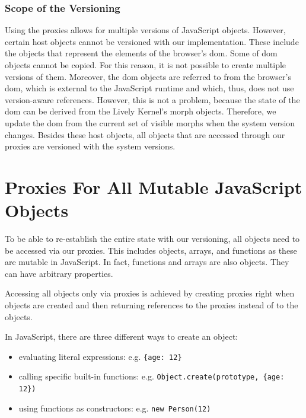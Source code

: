  
\subsubsection{Scope of the Versioning} \label{subsubsec:IMPLEMENTATION:5.2.1}

Using the proxies allows for multiple versions of JavaScript objects.
However, certain host objects cannot be versioned with our implementation.
These include the objects that represent the elements of the browser's \ac{dom}.
Some of \ac{dom} objects cannot be copied.
For this reason, it is not possible to create multiple versions of them.
Moreover, the \ac{dom} objects are referred to from the browser's \ac{dom}, which is external to the JavaScript runtime and which, thus, does not use version-aware references.
However, this is not a problem, because the state of the \ac{dom} can be derived from the Lively Kernel's morph objects.
Therefore, we update the \ac{dom} from the current set of visible morphs when the system version changes.
Besides these host objects, all objects that are accessed through our proxies are versioned with the system versions.


\section{Proxies For All Mutable JavaScript Objects}

To be able to re-establish the entire state with our versioning, all objects need to be accessed via our proxies.
This includes objects, arrays, and functions as these are mutable in JavaScript.
In fact, functions and arrays are also objects.
They can have arbitrary properties.

Accessing all objects only via proxies is achieved by creating proxies right when objects are created and then returning references to the proxies instead of to the objects.


In JavaScript, there are three different ways to create an object: 
\begin{itemize}
    \item evaluating literal expressions: e.g. \lstinline|{age: 12}|
    \item calling specific built-in functions: e.g. \lstinline|Object.create(prototype, {age: 12})|
    \item using functions as constructors: e.g. \lstinline|new Person(12)|
\end{itemize}



